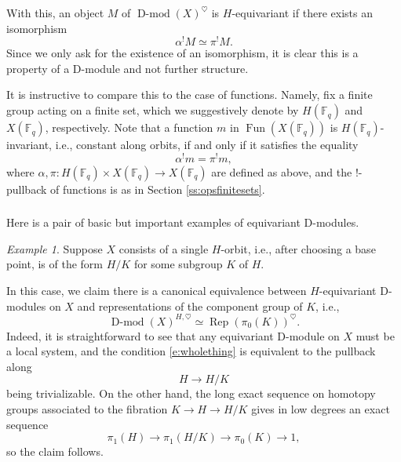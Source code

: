 \documentclass[10pt]{amsart}
\newcommand{\on}{\operatorname}
\newcommand{\Dmod}{\on{D-mod}}
\newcommand{\Fq}{\mathbb{F}_q}
\newcommand{\Fun}{\on{Fun}}
\theoremstyle{remark}
\newtheorem{ex}[subsubsection]{Example}
\numberwithin{equation}{section}
\begin{document}
	With this, an object $M$ of $\Dmod(X)^\heartsuit$ is $H$-equivariant if 
	there 
	exists an isomorphism \begin{equation} \alpha^! M \simeq \pi^! M. 
	\label{e:wholething}\end{equation}Since we only ask for the existence of an 
	isomorphism, it is clear this is a 
	property of a D-module and not further structure. 
	
	
	
	It is instructive to compare this to the case of functions. Namely, fix a 
	finite group acting on a finite set, which we suggestively denote by 
	$H(\Fq)$ 
	and $X(\Fq)$, respectively. Note that a function $m$ in $\Fun(X(\Fq))$ is 
	$H(\Fq)$-invariant, i.e., constant along orbits, if and only if it satisfies 
	the 
	equality
	\[
	\alpha^! m = \pi^! m,
	\]
	where $\alpha, \pi: H(\Fq) \times X(\Fq) \rightarrow X(\Fq)$ are defined as 
	above, and the $!$-pullback of functions is as in Section \ref{ss:opsfinitesets}. 
	
	
	
	\subsubsection{} Here is a pair of basic but important examples of equivariant D-modules. 
	
	\begin{ex} Suppose $X$ consists of a single $H$-orbit, i.e., after choosing 
	a base point, is of the form 
	 $H/K$ for some subgroup $K$ of $H$. 
	 
	 In this case, we claim there is a 
	 canonical equivalence between $H$-equivariant D-modules on $X$ and 
	 representations of the component group of $K$, i.e., 
	 \[
	        \Dmod(X)^{H, \heartsuit} \simeq \on{Rep}(\pi_0(K))^{\heartsuit}.
	 \]
	Indeed, it is straightforward to see that any equivariant D-module on $X$ 
	must be a local system, and the condition \eqref{e:wholething} is 
	equivalent to the pullback along 
	\[
	    H \rightarrow H/K
	\]
	being trivializable. On the other hand, the long exact sequence on homotopy 
	groups associated to the fibration $K \rightarrow H \rightarrow H/K$ gives 
	in low degrees an exact sequence 
	\[
	    \pi_1(H) \rightarrow \pi_1(H/K) \rightarrow \pi_0(K) \rightarrow 1,
	\]
	so the claim follows. \label{e:oneorbit}
	\end{ex}
	
	
	
\end{document}
